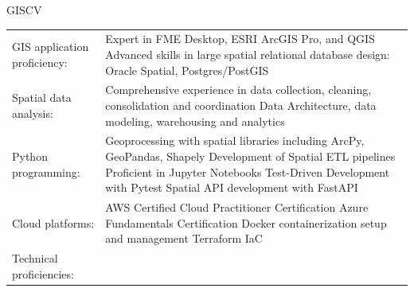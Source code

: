 \documentclass[letterpaper]{article}
\newenvironment{skillslist}
        {
            \hspace*{-0.07in}\begin{tabular}[t]{ l L{5.17in} }
        }{
            \end{tabular}
        }
\begin{document}
    \begin{taggedblock}{GISCV}
        \begin{skillslist}
            GIS application proficiency:&
                Expert in FME Desktop, ESRI ArcGIS Pro, and QGIS \linebreak
                Advanced skills in large spatial relational database design: Oracle Spatial, Postgres/PostGIS \linebreak
                \\
            Spatial data analysis:&
                Comprehensive experience in data collection, cleaning, consolidation and coordination \linebreak
                Data Architecture, data modeling, warehousing and analytics \linebreak
                \\
            Python programming:&
                Geoprocessing with spatial libraries including ArcPy, GeoPandas, Shapely \linebreak
                Development of Spatial ETL pipelines \linebreak
                Proficient in Jupyter Notebooks \linebreak
                Test-Driven Development with Pytest \linebreak
                Spatial API development with FastAPI \linebreak
                \\
            Cloud platforms:&
                AWS Certified Cloud Practitioner Certification \linebreak
                Azure Fundamentals Certification \linebreak
                Docker containerization setup and management \linebreak
                Terraform IaC \linebreak
                \\
            Technical proficiencies:&

\end{skillslist}
\end{taggedblock}
\end{document}
